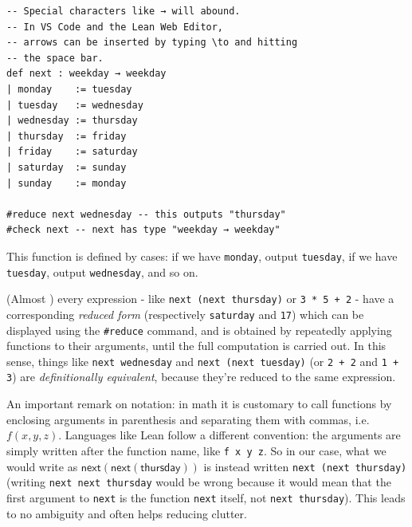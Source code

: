 \documentclass{book}
\theoremstyle{definition}
\theoremstyle{remark}
\theoremstyle{plain}
\begin{document}
\begin{lstlisting}
-- Special characters like → will abound.
-- In VS Code and the Lean Web Editor,
-- arrows can be inserted by typing \to and hitting
-- the space bar. 
def next : weekday → weekday
| monday    := tuesday
| tuesday   := wednesday
| wednesday := thursday
| thursday  := friday
| friday    := saturday
| saturday  := sunday
| sunday    := monday

#reduce next wednesday -- this outputs "thursday"
#check next -- next has type "weekday → weekday"
\end{lstlisting}
This function is defined by cases:
if we have \lstinline{monday}, output \lstinline{tuesday},
if we have \lstinline{tuesday}, output \lstinline{wednesday}, and so on.

(Almost \cite{CarneiroMaster}) every expression - like \lstinline{next (next thursday)} or \lstinline{3 * 5 + 2} -
have a corresponding \textit{reduced form} (respectively \lstinline{saturday} and \lstinline{17})
which can be displayed using the \lstinline{#reduce} command,
and is obtained by repeatedly applying functions to their arguments, until the full computation is carried out.
In this sense, things like \lstinline{next wednesday} and \lstinline{next (next tuesday)}
(or \lstinline{2 + 2} and \lstinline{1 + 3}) are \textit{definitionally equivalent}, because they're reduced to the same expression.

An important remark on notation:
in math it is customary to call functions by enclosing arguments in parenthesis and separating them with commas, i.e. $f(x,y,z)$.
Languages like Lean follow a different convention: the arguments are simply written after the function name, like \lstinline{f x y z}.
So in our case, what we would write as $\mathsf{next(next(thursday))}$ is instead written \lstinline{next (next thursday)}
(writing \lstinline{next next thursday} would be wrong
because it would mean that the first argument to \lstinline{next} is the function \lstinline{next} itself, not \lstinline{next thursday}).
This leads to no ambiguity and often helps reducing clutter.
\end{document}
